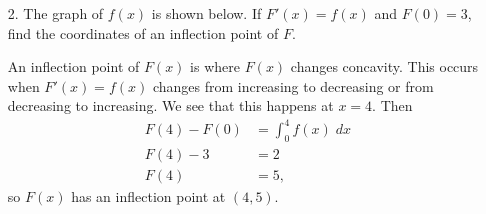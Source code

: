 \documentclass[11pt]{article}
\begin{document}
\newsavebox{\quizback}
\begin{lrbox}{\quizback}
\begin{minipage}[top][4.5in][t]{\textwidth} \setlength{\parindent}{1.5em}
\begin{enumerate}

\item[2.] The graph of $f(x)$ is shown below. If $F'(x)=f(x)$ and
  $F(0) = 3$, find the coordinates of an inflection point of $F$.

  \begin{center}
  \end{center}

  \vfill
  {\color{blue}
    
    An inflection point of $F(x)$ is where $F(x)$ changes concavity.
    This occurs when $F'(x) = f(x)$ changes from increasing to
    decreasing or from decreasing to increasing.  We see that this
    happens at $x = 4$.  Then
    \begin{align*}
      F(4) - F(0) &= \int_0^4 f(x)\; dx \\
      F(4) - 3 &= 2\\
      F(4) &= 5,
    \end{align*}
    so $F(x)$ has an inflection point at $(4,5)$.

  }
  \vfill

  
\end{enumerate}
\end{minipage}
\end{lrbox}

\noindent \usebox{\quizfront}

\noindent \usebox{\quizback}

\end{document}
